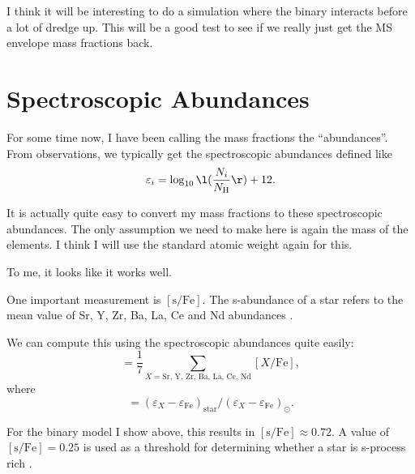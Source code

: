 \documentclass[a4paper,10pt]{article}
\begin{document}
I think it will be interesting to do a simulation where the binary interacts before
a lot of dredge up. This will be a good test to see if we really just get the 
MS envelope mass fractions back.

\section{Spectroscopic Abundances}

For some time now, I have been calling the mass fractions the ``abundances''. From observations,
we typically get the spectroscopic abundances defined like
\begin{equation*}
    \varepsilon_{i} = \log_{10}\l(\frac{N_{i}}{N_\text{H} }\r) + 12  .
\end{equation*}

It is actually quite easy to convert my mass fractions to these spectroscopic abundances.
The only assumption we need to make here is again the mass of the elements. I think I will use the standard atomic weight again for this.

\begin{figure}[ht]
    \centering
\end{figure}

To me, it looks like it works well.

One important measurement is \([\text{s} / \text{Fe} ]\). The s-abundance of a star refers to the
mean value of Sr, Y, Zr, Ba, La, Ce and Nd abundances \citep{yang2024}.

We can compute this using the spectroscopic abundances quite easily:
\begin{equation*}
    [\text{s} / \text{Fe}] = \frac{1}{7} \sum_{X = \text{Sr, Y, Zr, Ba, La, Ce, Nd}} [X / \text{Fe} ] ,
\end{equation*}
where
\begin{equation*}
    [X / \text{Fe}  ] = (\varepsilon_X - \varepsilon_\text{Fe})_\text{star} / (\varepsilon_X - \varepsilon_\text{Fe})_\odot   .
\end{equation*}

For the binary model I show above, this results in \([\text{s} / \text{Fe}  ] \approx 0.72\).
A value of \([\text{s} / \text{Fe}  ] = 0.25\) is used as a threshold for determining whether
a star is s-process rich \citep{yang2024}.


\nextpage
\appendix
\end{document}
